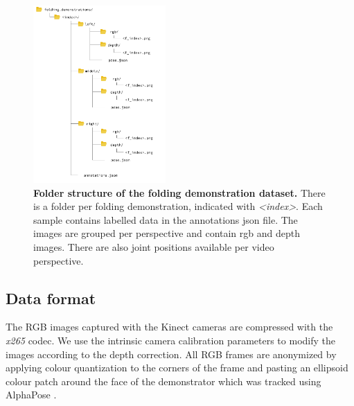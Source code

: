 \documentclass[\home/main.tex]{subfiles}
\begin{document}
\begin{figure}[htb]
  \centering
  \includegraphics[width=0.45\textwidth,keepaspectratio]{figures/folder_structure_with_icons.png} 
  \caption{ \textbf{Folder structure of the folding demonstration dataset.} There is a folder per folding demonstration, indicated with \textit{<index>}. Each sample contains labelled data in the annotations json file. The images are grouped per perspective and contain rgb and depth images. There are also joint positions available per video perspective. }
  \label{fig:folder_structure}
\end{figure}


\subsection{Data format}
The RGB images captured with the Kinect cameras are compressed with the \textit{x265} codec. We use the intrinsic camera calibration parameters to modify the images according to the depth correction. All RGB frames are anonymized by applying colour quantization to the corners of the frame and pasting an ellipsoid colour patch around the face of the demonstrator which was tracked using AlphaPose \autocite{Fang2017}. \par
\end{document}
